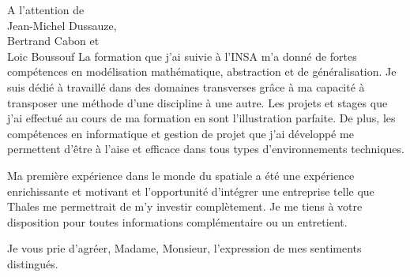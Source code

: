 \documentclass[12pt]{lettre}
\begin{document}
\begin{letter}{A l'attention de\\Jean-Michel Dussauze,\\Bertrand Cabon et\\ Loic Boussouf}
La formation que j'ai suivie à l'INSA m'a donné de fortes compétences en modélisation mathématique, abstraction et de généralisation. Je suis dédié à travaillé dans des domaines transverses grâce à ma capacité à transposer une méthode d'une discipline à une autre. Les projets et stages que j'ai effectué au cours de ma formation en sont l'illustration parfaite. De plus, les compétences en informatique et gestion de projet que j'ai développé me permettent d'être à l'aise et efficace dans tous types d'environnements techniques.%

Ma première expérience dans le monde du spatiale a été une expérience enrichissante et motivant et l'opportunité d'intégrer une entreprise  telle que Thales me permettrait de m'y investir complètement.
%
Je me tiens à votre disposition pour toutes informations complémentaire ou un entretient.
\closing{Je vous prie d'agréer, Madame, Monsieur, l'expression de mes sentiments distingués.}
\end{letter}
\end{document}

